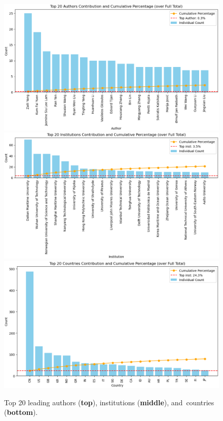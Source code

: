 \documentclass[jmse,review,accept,pdftex,moreauthors]{Definitions/mdpi}
\begin{document}
\begin{figure}[H]

	\includegraphics[height=0.3\textheight, keepaspectratio]{pics/leading_authors.eps}
	\includegraphics[height=0.3\textheight, keepaspectratio]{pics/leading_institutions.eps}
	\includegraphics[height=0.3\textheight, keepaspectratio]{pics/leading_countries.eps}
	\caption{Top 20 leading authors (\textbf{top}), institutions (\textbf{middle}), and~countries (\textbf{bottom}).}\label{fig:fig2}
\end{figure}
\unskip%
\end{document}
